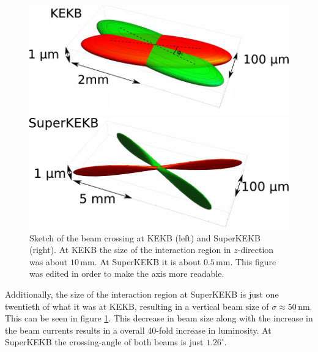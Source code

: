 \documentclass[a4paper,11pt,twosided,final,german,openbib,pdftex,listof=totoc,bibliography=totoc]{scrbook}
\begin{document}
\begin{figure}[h!]
	\centering
	\begin{minipage}[b]{0.45\linewidth}
		\centering
		\includegraphics[width=\textwidth]{Bilder/BeamBelle}
	\end{minipage}
	\hspace{0.5cm}
	\begin{minipage}[b]{0.45\linewidth}
		\centering
		\includegraphics[width=\textwidth]{Bilder/SuperKEKBBeam}
	\end{minipage}
		\caption[Sketch Of The Beam Crossing For KEKB And SuperKEKB]{Sketch of the beam crossing at KEKB (left) and SuperKEKB (right). At KEKB the size of the interaction region in $z$-direction was about $10\,\textrm{mm}$. At SuperKEKB it is about $0.5\,\textrm{mm}$.\cite{Beamsize} This figure was edited in order to make the axis more readable.}
	\label{fig:beamsize}

\end{figure}


Additionally, the size of the interaction region at SuperKEKB is just one twentieth of what it was at KEKB, resulting in a vertical beam size of $\sigma \approx 50\,\textrm{nm} $. This can be seen in figure \ref{fig:beamsize}. This decrease in beam size along with the increase in the beam currents results in a overall 40-fold increase in luminosity.  \cite{B2TR} \cite{B2B}
At SuperKEKB the crossing-angle of both beams is just $1.26^{\circ}$.
\end{document}
